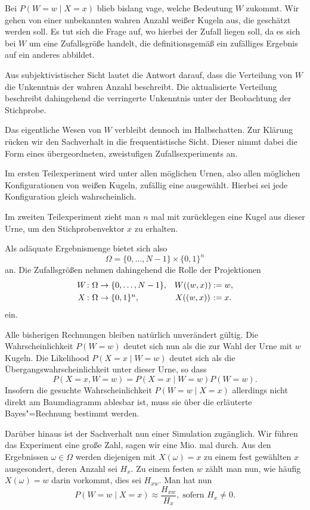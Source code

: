 \documentclass[8pt]{beamer}
\newcommand{\parspace}{\vspace{0.8em}}
\begin{document}
\begin{frame}
Bei $P(W=w\mid X=x)$ blieb bislang vage, welche Bedeutung $W$
zukommt. Wir gehen von einer unbekannten wahren Anzahl weißer Kugeln
aus, die geschätzt werden soll. Es tut sich die Frage auf, wo hierbei
der Zufall liegen soll, da es sich bei $W$ um eine Zufallsgröße handelt,
die definitionsgemäß ein zufälliges Ergebnis auf ein anderes abbildet.\pause

\parspace
Aus subjektivistischer Sicht lautet die Antwort darauf, dass die Verteilung
von $W$ die Unkenntnis der wahren Anzahl beschreibt. Die aktualisierte
Verteilung beschreibt dahingehend die verringerte Unkenntnis unter der
Beobachtung der Stichprobe.\pause

\parspace
Das eigentliche Wesen von $W$ verbleibt dennoch im Halbschatten.
Zur Klärung rücken wir den Sachverhalt in die frequentistische Sicht.
Dieser nimmt dabei die Form eines übergeordneten, zweistufigen
Zufallsexperiments an.
\end{frame}

\begin{frame}
Im ersten Teilexperiment wird unter allen möglichen Urnen, also
allen möglichen Konfigurationen von weißen Kugeln, zufällig eine
ausgewählt. Hierbei sei jede Konfiguration gleich wahrscheinlich.\pause

\parspace
Im zweiten Teilexperiment zieht man $n$ mal mit zurücklegen eine
Kugel aus dieser Urne, um den Stichprobenvektor $x$ zu erhalten.\pause

\parspace
Als adäquate Ergebnismenge bietet sich also
\[\Omega = \{0,\ldots,N-1\}\times\{0,1\}^n\]
an. Die Zufallsgrößen nehmen dahingehend die Rolle der
Projektionen 
\[\begin{array}{c@{}lc@{}l}
W &\colon\Omega\to\{0,\ldots,N-1\}, & W((w,x)) &{} :=w,\\[3pt]
X &\colon\Omega\to\{0,1\}^n, & X((w,x)) &{} :=x.
\end{array}\]
ein.
\end{frame}

\begin{frame}
Alle bisherigen Rechnungen bleiben natürlich unverändert gültig.
Die Wahrscheinlichkeit $P(W=w)$ deutet sich nun als die zur Wahl der
Urne mit $w$ Kugeln. Die Likelihood $P(X=x\mid W=w)$ deutet sich
als die Übergangswahrscheinlichkeit unter dieser Urne, so dass
\[P(X=x, W=w) = P(X=x\mid W=w)P(W=w).\]
Insofern die gesuchte Wahrscheinlichkeit $P(W=w\mid X=x)$ allerdings
nicht direkt am Baumdiagramm ablesbar ist, muss sie über die erläuterte
Bayes"=Rechnung bestimmt werden.\pause

\parspace
Darüber hinaus ist der Sachverhalt nun einer Simulation zugänglich.
Wir führen das Experiment eine große Zahl, sagen wir eine Mio. mal durch.
Aus den Ergebnissen $\omega\in\Omega$ werden diejenigen mit $X(\omega)=x$
zu einem fest gewählten $x$ ausgesondert, deren Anzahl sei $H_x$. Zu
einem festen $w$ zählt man nun, wie häufig $X(\omega)=w$ darin
vorkommt, dies sei $H_{xw}$. Man hat nun
\[P(W=w\mid X=x)\approx\frac{H_{xw}}{H_x},\;\text{sofern $H_x\ne 0$}.\]
\end{frame}
\end{document}
